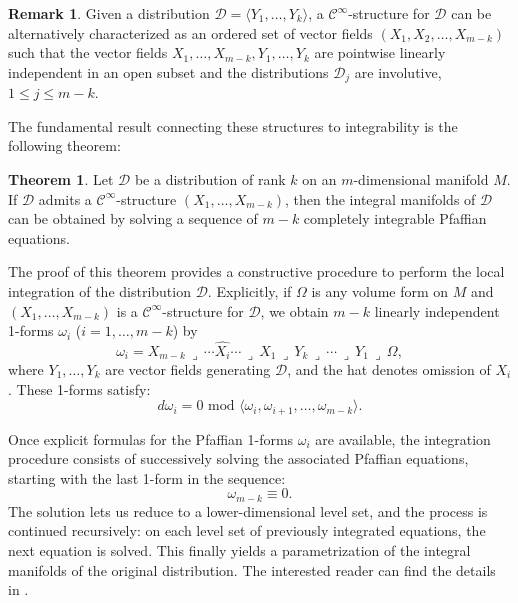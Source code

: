 \documentclass{article}
\theoremstyle{remark}
\theoremstyle{definition}
\newtheorem{theorem}{Theorem}[section]
\newtheorem{remark}{Remark}[section]
\newcommand{\cinf}{$\mathcal{C}^{\infty}$}
\newcommand{\contract}{\,\lrcorner\,}
\begin{document}
\begin{remark}
    Given a distribution $\mathcal{D} = \langle Y_1, \dots, Y_k \rangle$, a \cinf-structure for $\mathcal{D}$ can be alternatively characterized as an ordered set of vector fields $(X_1, X_2, \dots, X_{m-k})$ such that the vector fields $X_1, \dots, X_{m-k}, Y_1, \dots, Y_k$ are pointwise linearly independent in an open subset and the distributions $\mathcal{D}_j$ are involutive, $1 \leq j \leq m-k$. 
\end{remark}


The fundamental result connecting these structures to integrability is the following theorem:

\begin{theorem}\cite[Theorem 3.5]{pancinf-sym}\label{TZ}
Let $\mathcal{D}$ be a distribution of rank $k$ on an $m$-dimensional manifold $M$. If $\mathcal{D}$ admits a \cinf-structure $(X_1, \dots, X_{m-k})$, then the integral manifolds of $\mathcal{D}$ can be obtained by solving a sequence of $m-k$ completely integrable Pfaffian equations. 
\end{theorem}


The proof of this theorem provides a constructive procedure to perform the local integration of the distribution
$\mathcal{D}$. Explicitly, if $\Omega$ is any volume form on $M$ and $(X_1, \ldots, X_{m-k})$ is a \cinf-structure for $\mathcal{D}$, we obtain $m-k$ linearly independent 1-forms $\omega_i$ ($i=1,\ldots,m-k$) by
\begin{equation}\label{formscontract}
    \omega_i = X_{m-k}\contract \cdots \widehat{X_i} \cdots \contract X_{1} \contract Y_k \contract\cdots \contract Y_1 \contract \Omega,
\end{equation}
where $Y_1,\ldots,Y_k$ are vector fields generating $\mathcal{D}$, and the hat denotes omission of $X_i$. These 1-forms satisfy:
\begin{equation}\label{cinfcondforms}
    d\omega_i=0 \text{ mod } \langle\omega_i,\omega_{i+1},\ldots,\omega_{m-k}\rangle.
\end{equation}

Once explicit formulas for the Pfaffian 1-forms $\omega_i$ are available, the integration procedure consists of successively solving the associated Pfaffian equations, starting with the last 1-form in the sequence:
$$
\omega_{m-k}\equiv 0.
$$
The solution lets us reduce to a lower-dimensional level set, and the process is continued recursively: on each level set of previously integrated equations, the next equation is solved. This finally yields a parametrization of the integral manifolds of the original distribution.  The interested reader can find the details in \cite{pancinf-sym,pancinf-struct,pan23integration}. 
\end{document}
